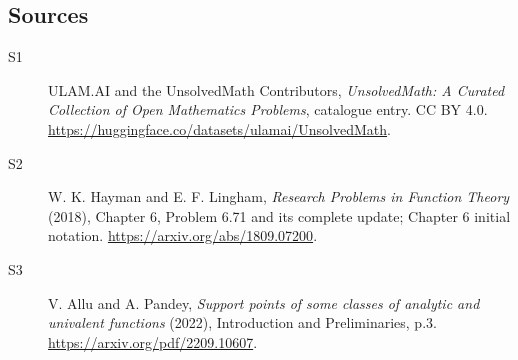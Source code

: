\documentclass[11pt]{article}
\begin{document}
\subsection{Sources}
\begin{description}
\item[\hypertarget{source:statement:1}{S1}] ULAM.AI and the UnsolvedMath Contributors, \emph{UnsolvedMath: A Curated Collection of Open Mathematics Problems}, catalogue entry. CC BY 4.0. \url{https://huggingface.co/datasets/ulamai/UnsolvedMath}.
\item[\hypertarget{source:statement:2}{S2}] W. K. Hayman and E. F. Lingham, \emph{Research Problems in Function Theory} (2018), Chapter 6, Problem 6.71 and its complete update; Chapter 6 initial notation. \url{https://arxiv.org/abs/1809.07200}.
\item[\hypertarget{source:statement:3}{S3}] V. Allu and A. Pandey, \emph{Support points of some classes of analytic and univalent functions} (2022), Introduction and Preliminaries, p.3. \url{https://arxiv.org/pdf/2209.10607}.
\end{description}
\label{end:statement}
\end{document}
